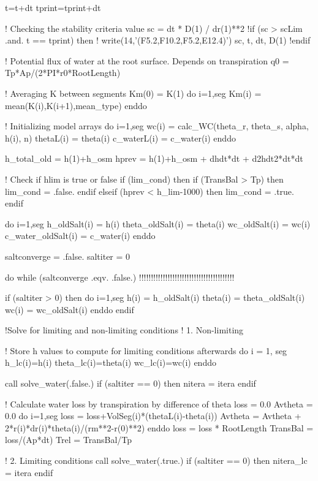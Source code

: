   t=t+dt
  tprint=tprint+dt

  ! Checking the stability criteria value
  sc = dt * D(1) / dr(1)**2
  !if (sc > scLim .and. t == tprint) then
  !  write(14,'(F5.2,F10.2,F5.2,E12.4)') sc, t, dt, D(1)
  !endif
  
  ! Potential flux of water at the root surface. Depends on transpiration
  q0 = Tp*Ap/(2*PI*r0*RootLength)

  ! Averaging K between segments
  Km(0) = K(1)
  do i=1,seg
    Km(i) = mean(K(i),K(i+1),mean_type)
  enddo

  ! Initializing model arrays
  do i=1,seg
    wc(i) = calc_WC(theta_r, theta_s, alpha, h(i), n)
    thetaL(i) = theta(i)
    c_waterL(i) = c_water(i)
  enddo

  h_total_old = h(1)+h_osm
  hprev = h(1)+h_osm + dhdt*dt + d2hdt2*dt*dt

  ! Check if hlim is true or false
  if (lim_cond) then
    if (TransBal > Tp) then
      lim_cond = .false.
    endif
  elseif (hprev < h_lim-1000) then
    lim_cond = .true.
  endif

  do i=1,seg
    h_oldSalt(i) = h(i)
    theta_oldSalt(i) = theta(i)
    wc_oldSalt(i) = wc(i)
    c_water_oldSalt(i) = c_water(i)
  enddo

  saltconverge = .false.
  saltiter = 0

  do while (saltconverge .eqv. .false.) !!!!!!!!!!!!!!!!!!!!!!!!!!!!!!!!!!!!!!!!
    
    if (saltiter > 0) then
      do i=1,seg
        h(i) = h_oldSalt(i)
        theta(i) = theta_oldSalt(i)
        wc(i) = wc_oldSalt(i)
      enddo
    endif

    !Solve for limiting and non-limiting conditions
    ! 1. Non-limiting

    ! Store h values to compute for limiting conditions afterwards
    do i = 1, seg
      h_lc(i)=h(i)
      theta_lc(i)=theta(i)
      wc_lc(i)=wc(i)
    enddo
    
    call solve_water(.false.)
    if (saltiter == 0) then
      nitera = itera
    endif
    
    ! Calculate water loss by transpiration by difference of theta
    loss = 0.0
    Avtheta = 0.0
    do i=1,seg
      loss = loss+VolSeg(i)*(thetaL(i)-theta(i))
      Avtheta = Avtheta + 2*r(i)*dr(i)*theta(i)/(rm**2-r(0)**2)
    enddo
    loss = loss * RootLength
    TransBal = loss/(Ap*dt)
    Trel = TransBal/Tp

    ! 2. Limiting conditions
    call solve_water(.true.)
    if (saltiter == 0) then
      nitera_lc = itera
    endif

